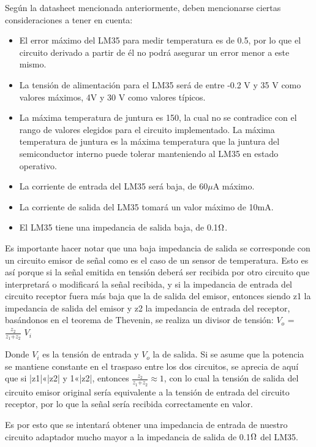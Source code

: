\documentclass[../../main.tex]{subfiles}
\begin{document}
Según la datasheet mencionada anteriormente, deben mencionarse ciertas consideraciones a tener en cuenta: 
\begin{itemize}
\item El error máximo del LM35 para medir temperatura es de 0.5\celsius, por lo que el circuito derivado a partir de él no podrá asegurar un error menor a este mismo.
\item La tensión de alimentación para el LM35 será de entre -0.2 V y 35 V como valores máximos, 4V  y 30 V como valores típicos.
\item La máxima temperatura de juntura es 150\celsius, la cual no se contradice con el rango de valores elegidos para el circuito implementado. La máxima temperatura de juntura es la máxima temperatura que la juntura del semiconductor interno puede tolerar manteniendo al LM35 en estado operativo.
\item La corriente de entrada del LM35 será baja, de 60$\mu$A máximo.
\item La corriente de salida del LM35 tomará un valor máximo de 10mA.
\item El LM35 tiene una impedancia de salida baja, de 0.1$\ohm$.
\end{itemize}

Es importante hacer notar que una baja impedancia de salida se corresponde con un circuito emisor de señal como es el caso de un sensor de temperatura. Esto es así porque si la señal emitida en tensión deberá ser recibida por otro circuito que interpretará o modificará la señal recibida, y si la impedancia de entrada del circuito receptor fuera más baja que la de salida del emisor, entonces
siendo z1 la impedancia de salida del emisor y z2 la impedancia de entrada del receptor, basándonos en el teorema de Thevenin, se realiza un divisor de tensión:
$V_o$ = $\frac{z_{2}}{z_{1}\text{+}z_{2}}$ $V_i$\par
Donde $V_i$ es la tensión de entrada y $V_o$ la de salida. Si se asume que la potencia se mantiene constante en el traspaso entre los dos circuitos, se aprecia de aquí que si |z1|«|z2| y 1«|z2|, entonces $\frac{z_{2}}{z_{1}\text{+}z_{2}}\approx 1$, con lo cual la tensión de salida del circuito emisor original sería equivalente a la tensión de entrada del circuito receptor, por lo que la señal sería recibida correctamente en valor. \par
Es por esto que se intentará obtener una impedancia de entrada de nuestro circuito adaptador mucho mayor a la impedancia de salida de 0.1$\ohm$ del LM35.
\end{document}
